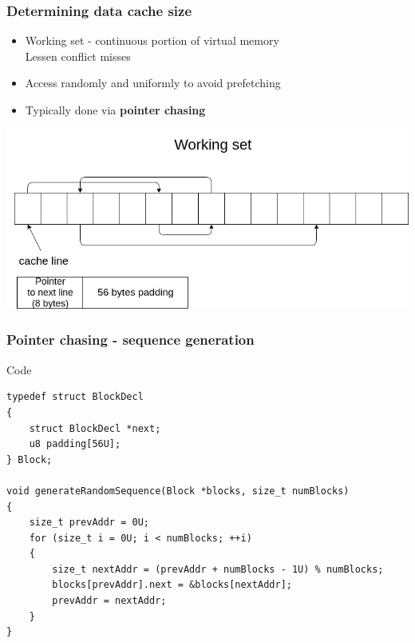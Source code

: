\documentclass{beamer}
\begin{document}
\begin{frame}
\frametitle{Determining data cache size}
\begin{itemize}
\item Working set - continuous portion of virtual memory\\
      Lessen conflict misses
\item Access randomly and uniformly to avoid prefetching
\item Typically done via \textbf{pointer chasing}
\end{itemize}
\begin{center}
\includegraphics[scale=.3]{img/pchase.jpg}
\end{center}
\end{frame}

\begin{frame}[fragile]
\frametitle{Pointer chasing - sequence generation}
\begin{block}{Code}
\begin{lstlisting}[style=code]
typedef struct BlockDecl
{
    struct BlockDecl *next;
    u8 padding[56U];
} Block;

void generateRandomSequence(Block *blocks, size_t numBlocks)
{
    size_t prevAddr = 0U;
    for (size_t i = 0U; i < numBlocks; ++i)
    {
        size_t nextAddr = (prevAddr + numBlocks - 1U) % numBlocks;
        blocks[prevAddr].next = &blocks[nextAddr];
        prevAddr = nextAddr;
    }
}
\end{lstlisting}
\end{block}
\end{frame}
\end{document}
